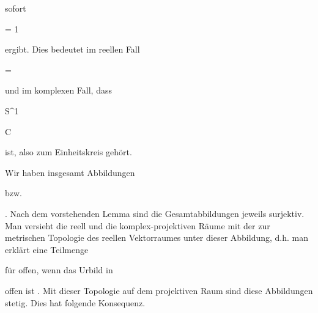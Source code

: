 {{{   }{
}

}
{}{}{}
sofort


\mavergleichskette

{\vergleichskette

{ \betrag {  \lambda }
}

{ = }{ 1
}

{  }{
}

{    }{
}

{   }{
}

}
{}{}{}
ergibt. Dies bedeutet im reellen Fall


\mavergleichskette

{\vergleichskette

{ \lambda
}

{ = }{ 
}

{  }{
}

{    }{
}

{   }{
}

}
{}{}{}
und im komplexen Fall, dass


\mavergleichskette

{\vergleichskette

{ \lambda
}

{ \in }{ S^1
}

{ \subset }{ {\mathbb C}
}

{    }{
}

{   }{
}

}
{}{}{}
ist, also zum Einheitskreis gehört.


}


Wir haben insgesamt Abbildungen


 {  }


 {} {}
bzw.


 {  }


 {} {.}
Nach dem vorstehenden Lemma sind die Gesamtabbildungen jeweils surjektiv. Man versieht die reell und die komplex-projektiven Räume mit der
zur metrischen Topologie des reellen Vektorraumes unter dieser Abbildung, d.h. man erklärt eine Teilmenge

 für offen, wenn das Urbild in

 offen ist
 {} {.}
Mit dieser
 {} {}
Topologie auf dem projektiven Raum sind diese Abbildungen stetig. Dies hat folgende Konsequenz.


